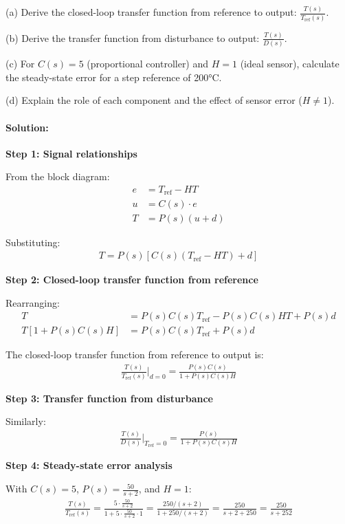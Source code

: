 \documentclass[11pt,a4paper]{article}
\begin{document}
(a) Derive the closed-loop transfer function from reference to output: $\frac{T(s)}{T_{\text{ref}}(s)}$.

(b) Derive the transfer function from disturbance to output: $\frac{T(s)}{D(s)}$.

(c) For $C(s) = 5$ (proportional controller) and $H = 1$ (ideal sensor), calculate the steady-state error for a step reference of 200°C.

(d) Explain the role of each component and the effect of sensor error ($H \neq 1$).

\paragraph{Solution:}

\textbf{Step 1: Signal relationships}

From the block diagram:
\begin{align}
  e &= T_{\text{ref}} - HT \\
  u &= C(s) \cdot e \\
  T &= P(s)(u + d)
\end{align}

Substituting:
\begin{align}
  T = P(s)[C(s)(T_{\text{ref}} - HT) + d]
\end{align}

\textbf{Step 2: Closed-loop transfer function from reference}

Rearranging:
\begin{align}
  T &= P(s)C(s)T_{\text{ref}} - P(s)C(s)HT + P(s)d \\
  T[1 + P(s)C(s)H] &= P(s)C(s)T_{\text{ref}} + P(s)d
\end{align}

The closed-loop transfer function from reference to output is:
\begin{align}
  \frac{T(s)}{T_{\text{ref}}(s)}\bigg|_{d=0} = \frac{P(s)C(s)}{1 + P(s)C(s)H}
\end{align}

\textbf{Step 3: Transfer function from disturbance}

Similarly:
\begin{align}
  \frac{T(s)}{D(s)}\bigg|_{T_{\text{ref}}=0} = \frac{P(s)}{1 + P(s)C(s)H}
\end{align}

\textbf{Step 4: Steady-state error analysis}

With $C(s) = 5$, $P(s) = \frac{50}{s+2}$, and $H = 1$:
\begin{align}
  \frac{T(s)}{T_{\text{ref}}(s)} = \frac{5 \cdot \frac{50}{s+2}}{1 + 5 \cdot \frac{50}{s+2} \cdot 1} = \frac{250/(s+2)}{1 + 250/(s+2)} = \frac{250}{s+2+250} = \frac{250}{s+252}
\end{align}
\end{document}
